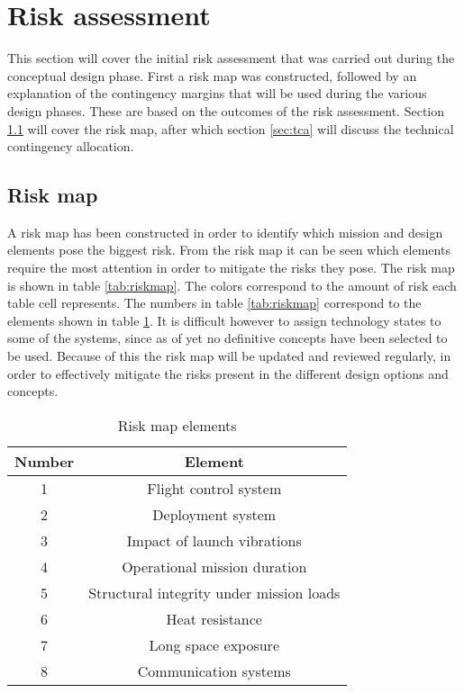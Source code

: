 \section{Risk assessment} 
\label{ch:risk}
This section will cover the initial risk assessment that was carried out during the conceptual design phase. First a risk map was constructed, followed by an explanation of the contingency margins that will be used during the various design phases. These are based on the outcomes of the risk assessment. Section \ref{sec:riskmap} will cover the risk map, after which section \ref{sec:tca} will discuss the technical contingency allocation.

\subsection{Risk map}
\label{sec:riskmap}
 A risk map has been constructed in order to identify which mission and design elements pose the biggest risk. From the risk map it can be seen which elements require the most attention in order to mitigate the risks they pose. The risk map is shown in table \ref{tab:riskmap}. The colors correspond to the amount of risk each table cell represents. The numbers in table \ref{tab:riskmap} correspond to the elements shown in table \ref{tab:riskelements}. It is difficult however to assign technology states to some of the systems, since as of yet no definitive concepts have been selected to be used. Because of this the risk map will be updated and reviewed regularly, in order to effectively mitigate the risks present in the different design options and concepts.

\begin{table}[h]
	\centering
	\caption{Risk map elements}
	\label{tab:riskelements}
	\begin{tabular}{|c|c|}
		\hline
		\textbf{Number} & \textbf{Element} \\
		\hline
		1 & Flight control system\\
		2 & Deployment system\\
		3 & Impact of launch vibrations\\
		4 & Operational mission duration\\
		5 & Structural integrity under mission loads\\
		6 & Heat resistance\\
		7 & Long space exposure\\
		8 & Communication systems\\
		\hline
	\end{tabular}
\end{table}

